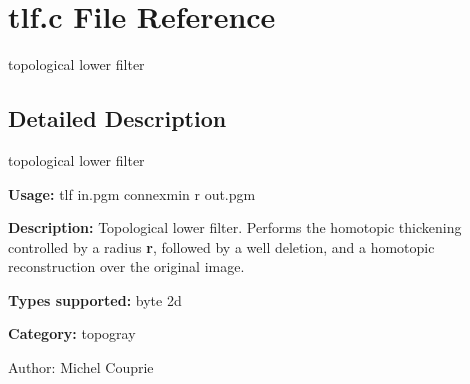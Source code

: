\section{tlf.c File Reference}
\label{tlf_8c}
topological lower filter  




\label{_details}
\subsection{Detailed Description}
topological lower filter 

{\bf Usage:} tlf in.pgm connexmin r out.pgm

{\bf Description:} Topological lower filter. Performs the homotopic thickening controlled by a radius {\bf r}, followed by a well deletion, and a homotopic reconstruction over the original image.

{\bf Types supported:} byte 2d

{\bf Category:} topogray

\begin{Desc}
\item[Author:]Michel Couprie \end{Desc}
